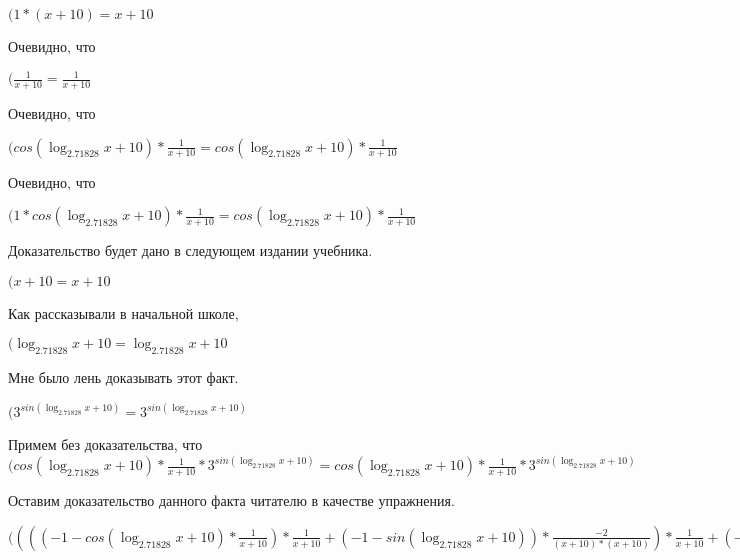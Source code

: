 \documentclass[12pt,a4paper,fleqn]{article}
\theoremstyle{definition}
\begin{document}
$( 1  * ( x  +  10 ) =  x  +  10 $

Очевидно, что

$(\frac{ 1 }{ x  +  10 }
 = \frac{ 1 }{ x  +  10 }
$

Очевидно, что

$(cos(\log_{ 2.71828 }{ x  +  10 }) * \frac{ 1 }{ x  +  10 }
 = cos(\log_{ 2.71828 }{ x  +  10 }) * \frac{ 1 }{ x  +  10 }
$

Очевидно, что

$( 1  * cos(\log_{ 2.71828 }{ x  +  10 }) * \frac{ 1 }{ x  +  10 }
 = cos(\log_{ 2.71828 }{ x  +  10 }) * \frac{ 1 }{ x  +  10 }
$

Доказательство будет дано в следующем издании учебника.

$( x  +  10  =  x  +  10 $

Как рассказывали в начальной школе,

$(\log_{ 2.71828 }{ x  +  10 } = \log_{ 2.71828 }{ x  +  10 }$

Мне было лень доказывать этот факт.

$({ 3 }^{sin(\log_{ 2.71828 }{ x  +  10 })} = { 3 }^{sin(\log_{ 2.71828 }{ x  +  10 })}$

Примем без доказательства, что
$(cos(\log_{ 2.71828 }{ x  +  10 }) * \frac{ 1 }{ x  +  10 }
 * { 3 }^{sin(\log_{ 2.71828 }{ x  +  10 })} = cos(\log_{ 2.71828 }{ x  +  10 }) * \frac{ 1 }{ x  +  10 }
 * { 3 }^{sin(\log_{ 2.71828 }{ x  +  10 })}$

Оставим доказательство данного факта читателю в качестве упражнения.

$(((( -1  - cos(\log_{ 2.71828 }{ x  +  10 }) * \frac{ 1 }{ x  +  10 }
) * \frac{ 1 }{ x  +  10 }
 + ( -1  - sin(\log_{ 2.71828 }{ x  +  10 })) * \frac{ -2 }{( x  +  10 ) * ( x  +  10 )}
) * \frac{ 1 }{ x  +  10 }
 + ( -1  - sin(\log_{ 2.71828 }{ x  +  10 })) * \frac{ 1 }{ x  +  10 }
 * \frac{ -2 }{( x  +  10 ) * ( x  +  10 )}
 + ( -1  - sin(\log_{ 2.71828 }{ x  +  10 })) * \frac{ 1 }{ x  +  10 }
 * \frac{ -2 }{( x  +  10 ) * ( x  +  10 )}
 + cos(\log_{ 2.71828 }{ x  +  10 }) * \frac{ -1  -  -2  * ( x  +  10  +  x  +  10 )}{( x  +  10 ) * ( x  +  10 ) * ( x  +  10 ) * ( x  +  10 )}
) * cos(\log_{ 2.71828 }{ x  +  10 }) * \frac{ 1 }{ x  +  10 }
 * { 3 }^{sin(\log_{ 2.71828 }{ x  +  10 })} = ((( -1  - cos(\log_{ 2.71828 }{ x  +  10 }) * \frac{ 1 }{ x  +  10 }
) * \frac{ 1 }{ x  +  10 }
 + ( -1  - sin(\log_{ 2.71828 }{ x  +  10 })) * \frac{ -2 }{( x  +  10 ) * ( x  +  10 )}
) * \frac{ 1 }{ x  +  10 }
 + ( -1  - sin(\log_{ 2.71828 }{ x  +  10 })) * \frac{ 1 }{ x  +  10 }
 * \frac{ -2 }{( x  +  10 ) * ( x  +  10 )}
 + ( -1  - sin(\log_{ 2.71828 }{ x  +  10 })) * \frac{ 1 }{ x  +  10 }
 * \frac{ -2 }{( x  +  10 ) * ( x  +  10 )}
 + cos(\log_{ 2.71828 }{ x  +  10 }) * \frac{ -1  -  -2  * ( x  +  10  +  x  +  10 )}{( x  +  10 ) * ( x  +  10 ) * ( x  +  10 ) * ( x  +  10 )}
) * cos(\log_{ 2.71828 }{ x  +  10 }) * \frac{ 1 }{ x  +  10 }
 * { 3 }^{sin(\log_{ 2.71828 }{ x  +  10 })}$
\end{document}
